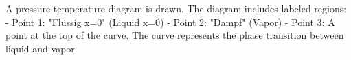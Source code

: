 A pressure-temperature diagram is drawn. The diagram includes labeled regions:  
- Point 1: "Flüssig x=0" (Liquid x=0)  
- Point 2: "Dampf" (Vapor)  
- Point 3: A point at the top of the curve.  
The curve represents the phase transition between liquid and vapor.